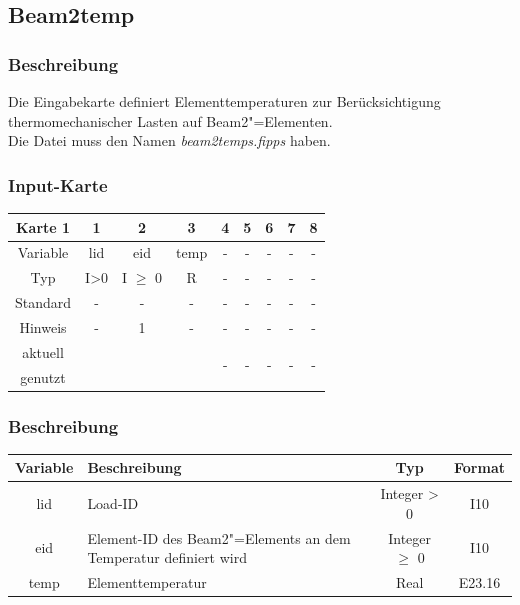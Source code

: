 \documentclass[11pt,titlepage,listof=totoc,bibliography=totoc,twoside]{scrreprt}
\begin{document}
{{\newpage

\subsection{Beam2temp}

\subsubsection{Beschreibung}

Die Eingabekarte definiert Elementtemperaturen zur Berücksichtigung thermomechanischer Lasten auf Beam2"=Elementen.\\
Die Datei muss den Namen \emph{beam2temps.fipps} haben.

\subsubsection{Input-Karte}

\begin{table}[htbp]
\centering
\begin{tabularx}{\textwidth}{cCCCCCCCC}
\toprule
Karte 1         & 1     & 2          & 3          & 4  & 5  & 6  & 7  & 8  \\
\midrule
Variable        & lid   & eid        & temp       & -  & -  & -  & -  & -  \\
Typ             & I>0   & I $\geq$ 0 & R          & -  & -  & -  & -  & -  \\
Standard        & -     & -          & -          & -  & -  & -  & -  & -  \\
Hinweis         & -     & 1          & -          & -  & -  & -  & -  & -  \\
aktuell         &  &  &  &   &   &   &   &   \\
genutzt \\
\bottomrule
\end{tabularx}
\end{table}

\subsubsection{Beschreibung}

\begin{tabularx}{\textwidth}{cXcc}
\toprule
Variable  & Beschreibung  & Typ          & Format  \\
\midrule
lid       & Load-ID       & Integer > 0  & I10     \\
eid       & Element-ID des Beam2"=Elements an dem Temperatur definiert wird & Integer $\geq$ 0 & I10  \\
temp      & Elementtemperatur & Real      & E23.16  \\
\bottomrule
\end{tabularx}

}}
\end{document}
